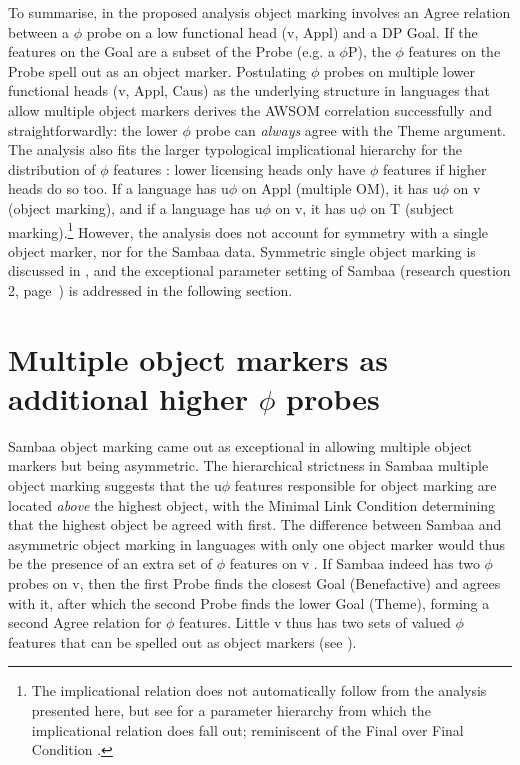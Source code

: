 \documentclass[output=paper
,modfonts
,nonflat]{langsci/langscibook}
\begin{document}
To summarise, in the proposed analysis object marking involves an Agree relation between a $\phi$ probe on a low functional head (v, Appl) and a DP Goal. If the features on the Goal are a subset of the Probe (e.g. a $\phi$P), the $\phi$ features on the Probe spell out as an object marker. Postulating $\phi$ probes on multiple lower functional heads (v, Appl, Caus) as the underlying structure in languages that allow multiple object markers derives the AWSOM correlation successfully and straightforwardly: the lower $\phi$ probe can \textit{always} agree with the Theme argument. The analysis also fits the larger typological implicational hierarchy for the distribution of $\phi$ features \citep{Moravcsik1974, Givon1976}: lower licensing heads only have $\phi$ features if higher heads do so too. If a language has u$\phi$ on Appl (multiple OM), it has u$\phi$ on v (object marking), and if a language has u$\phi$ on v, it has u$\phi$ on T (subject marking).\footnote{The implicational relation does not automatically follow from the analysis presented here, but see \citet{Van_der_WalTA} for a parameter hierarchy from which the implicational relation does fall out; reminiscent of the Final over Final Condition \citep{Sheehan_et_al2017}.} However, the analysis does not account for symmetry with a single object marker, nor for the Sambaa data. Symmetric single object marking is discussed in , and the exceptional parameter setting of Sambaa (research question 2, page~\pageref{vdw:researchquestions}) is addressed in the following section. 

\section{Multiple object markers as additional higher \texorpdfstring{$\phi$}{\textphi} probes} \label{sec-vdwal:6}

Sambaa object marking came out as exceptional in allowing multiple object markers but being asymmetric. The hierarchical strictness in Sambaa multiple object marking suggests that the u$\phi$ features responsible for object marking are located \textit{above} the highest object, with the Minimal Link Condition determining that the highest object be agreed with first. The difference between Sambaa and asymmetric object marking in languages with only one object marker would thus be the presence of an extra set of $\phi$ features on v \citep{Adams2010}. If Sambaa indeed has two $\phi$ probes on v, then the first Probe finds the closest Goal (Benefactive) and agrees with it, after which the second Probe finds the lower Goal (Theme), forming a second Agree relation for $\phi$ features. Little v thus has two sets of valued $\phi$ features that can be spelled out as object markers (see ).
\end{document}
